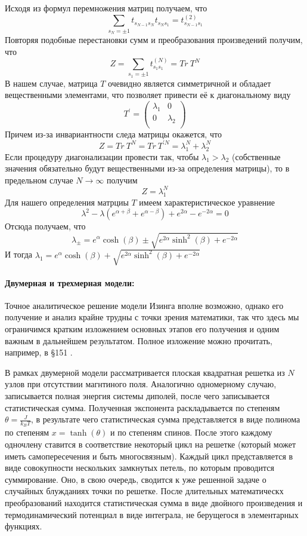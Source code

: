 \documentclass[oneside,final,14pt]{extarticle}
\begin{document}
	Исходя из формул перемножения матриц получаем, что 
$$\sum_{s_{N}=\pm 1}t_{s_{N-1}s_{N}}t_{s_{N}s_{1}}=t^{(2)}_{s_{N-1}s_{1}}$$
	Повторяя подобные перестановки сумм и преобразования произведений получим, что 
$$Z=\sum_{s_{1}=\pm 1}t^{(N)}_{s_{1}s_{1}}=Tr \ T^{N}$$
	В нашем случае, матрица $T$ очевидно является симметричной и обладает вещественными элементами, что позволяет привести её к диагональному виду 
$$
T^\prime=
\begin{pmatrix}
\lambda_{1} & 0 \\
0 & \lambda_{2} \\
\end{pmatrix}
$$
	Причем из-за инвариантности следа матрицы окажется, что 
$$Z=Tr \ T^{N}=Tr \ T^{\prime N}=\lambda_{1}^N+\lambda_{2}^{N}$$
	Если процедуру диагонализации провести так, чтобы $\lambda_{1} > \lambda_{2}$ (собственные значения обязательно будут вещественными из-за определения матрицы), то в предельном случае $N\rightarrow \infty$ получим 
$$Z=\lambda_1^{N}$$
	Для нашего определения матрциы $T$ имеем характеристическое уравнение 
$$\lambda^2-\lambda(e^{\alpha+\beta}+e^{\alpha-\beta})+e^{2\alpha}-e^{-2\alpha}=0$$
	Отсюда получаем, что 
$$\lambda_{\pm}=e^{\alpha}\cosh(\beta)\pm\sqrt{e^{2\alpha}\sinh^{2}(\beta)+e^{-2\alpha}}$$
	И тогда $\lambda_{1}=e^{\alpha}\cosh(\beta)+\sqrt{e^{2\alpha}\sinh^{2}(\beta)+e^{-2\alpha}}$
	\paragraph{Двумерная и трехмерная модели:}
	Точное аналитическое решение модели Изинга вполне возможно, однако его получение и анализ крайне трудны с точки зрения математики, так что здесь мы ограничимся кратким изложением основных этапов его получения и одним важным в дальнейшем результатом. Полное изложение можно прочитать, например, в \S 151 \cite{land5}.

	В рамках двумерной модели рассматривается плоская квадратная решетка из $N$ узлов при отсутствии магнтиного поля. Аналогично одномерному случаю, записывается полная энергия системы диполей, после чего записывается статистическая сумма. Полученная экспонента раскладывается по степеням $\theta = \frac{J}{k_{B}T}$, в результате чего статистическая сумма представляется в виде полинома по степеням $x=\tanh(\theta)$ и по степеням спинов. После этого каждому одночлену ставится в соответствие некоторый цикл на решетке (который может иметь самопересечения и быть многосвязным). Каждый цикл представляется в виде совокупности нескольких замкнутых петель, по которым проводится суммирование. Оно, в свою очередь, сводится к уже решенной задаче о случайных блужданиях точки по решетке. После длительных математическх преобразований находится статистическая сумма в виде двойного произведения и термодинамический потенциал в виде интеграла, не берущегося в элементарных функциях. 
\end{document}

